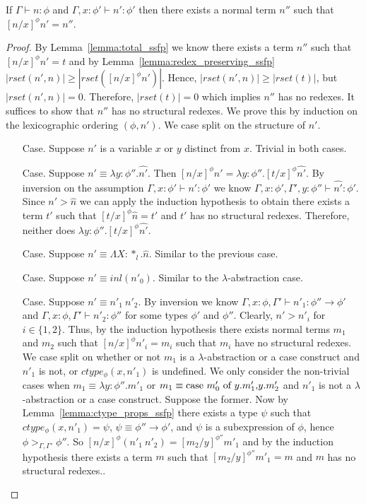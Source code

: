 \begin{lemma}
  \label{corollary:normalization_preserving_ssfp}
  If $\Gamma \vdash n:\phi$ and $\Gamma, x:\phi' \vdash n':\phi'$ then there exists 
  a normal term $n''$ such that $[n/x]^\phi n' = n''$.
\end{lemma}
\begin{proof}
  By Lemma~\ref{lemma:total_ssfp} we know there exists a term $n''$ such that $[n/x]^\phi n' = t$ and by 
  Lemma~\ref{lemma:redex_preserving_ssfp} 
  $|rset(n', n)| \geq |rset([n/x]^\phi n')|$.  Hence, $|rset(n', n)| \geq |rset(t)|$, but
  $|rset(n', n)| = 0$.  Therefore, $|rset(t)| = 0$ which implies $n''$ has no redexes.  It suffices to show
  that $n''$ has no structural redexes.  We prove this by induction on the lexicographic ordering $(\phi,n')$.
  We case split on the structure of $n'$.
\begin{itemize}
\item[Case.] Suppose $n'$ is a variable $x$ or $y$ distinct from $x$.  Trivial in both cases.
  
\item[Case.] Suppose $n' \equiv \lambda y:\phi''.\hat{n'}$.  Then
  $[n/x]^\phi n' = \lambda y:\phi''.[t/x]^\phi \hat{n'}$. By inversion on the assumption  
  $\Gamma, x:\phi' \vdash n':\phi'$ we know $\Gamma, x:\phi',\Gamma',y:\phi'' \vdash \hat{n'}:\phi'$.  Since
  $n' > \hat{n}$ we can apply the induction hypothesis to obtain there exists a term $t'$ such that
  $[t/x]^\phi \hat{n} = t'$ and $t'$ has no structural redexes.  Therefore, neither does 
  $\lambda y:\phi''.[t/x]^\phi \hat{n'}$.
  
\item[Case.] Suppose $n' \equiv \Lambda X:*_l.\hat{n}$.  Similar to the previous case.
  
\item[Case.] Suppose $n' \equiv inl(n'_0)$.  Similar to the $\lambda$-abstraction case.
  
\item[Case.] Suppose $n' \equiv n'_1\ n'_2$.  By inversion we know
  $\Gamma, x:\phi, \Gamma' \vdash n'_1 : \phi'' \to \phi'$ and
  $\Gamma, x:\phi, \Gamma' \vdash n'_2 : \phi''$ for some types $\phi'$ and $\phi''$.
  Clearly, $n' > n'_i$ for $i \in \{1,2\}$.  Thus, by the induction hypothesis
  there exists normal terms $m_1$ and $m_2$ such that $[n/x]^\phi n'_i = m_i$ such that $m_i$ have no
  structural redexes.  We case split on whether or not $m_1$ is a $\lambda$-abstraction
  or a case construct and $n'_1$ is not, or $ctype_\phi(x,n'_1)$ is undefined.  
  We only consider the non-trivial cases when 
  $m_1 \equiv \lambda y:\phi''.m'_1$ or $m_1 \equiv \mbox{case}\ m'_0\ \text{of}\ y\text{.}m'_1\text{,}y\text{.}m'_2$ and $n'_1$
  is not a $\lambda$-abstraction or a case construct.
  Suppose the former.  
  Now by Lemma~\ref{lemma:ctype_props_ssfp} there exists a type $\psi$ such that 
  $ctype_\phi(x, n'_1) = \psi$, $\psi \equiv \phi'' \to \phi'$, and $\psi$ is a subexpression
  of $\phi$, hence $\phi >_{\Gamma,\Gamma'} \phi''$. So $[n/x]^\phi (n'_1\ n'_2) = [m_2/y]^{\phi''} m'_1$ and
  by the induction hypothesis there exists a term $m$ such that 
  $[m_2/y]^{\phi''} m'_1 = m$ and $m$ has no structural redexes..  
  

\end{itemize}
\end{proof}
